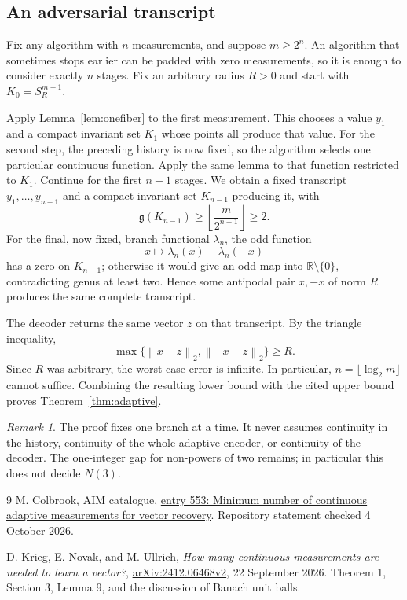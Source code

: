 \documentclass[11pt,a4paper]{article}
\theoremstyle{remark}
\newtheorem{remark}[theorem]{Remark}
\newcommand{\R}{\mathbb R}
\newcommand{\norm}[1]{\left\lVert #1\right\rVert}
\newcommand{\gen}{\mathfrak g}
\begin{document}
\subsection{An adversarial transcript}

Fix any algorithm with $n$ measurements, and suppose $m\ge2^n$. An algorithm that sometimes stops earlier can be padded with zero measurements, so it is enough to consider exactly $n$ stages. Fix an arbitrary radius $R>0$ and start with $K_0=S_R^{m-1}$.

Apply Lemma~\ref{lem:onefiber} to the first measurement. This chooses a value $y_1$ and a compact invariant set $K_1$ whose points all produce that value. For the second step, the preceding history is now fixed, so the algorithm selects one particular continuous function. Apply the same lemma to that function restricted to $K_1$. Continue for the first $n-1$ stages. We obtain a fixed transcript $y_1,\ldots,y_{n-1}$ and a compact invariant set $K_{n-1}$ producing it, with
\[
 \gen(K_{n-1})\ge
 \left\lfloor\frac{m}{2^{n-1}}\right\rfloor\ge2.
\]
For the final, now fixed, branch functional $\lambda_n$, the odd function
\[
 x\longmapsto\lambda_n(x)-\lambda_n(-x)
\]
has a zero on $K_{n-1}$; otherwise it would give an odd map into $\R\setminus\{0\}$, contradicting genus at least two. Hence some antipodal pair $x,-x$ of norm $R$ produces the same complete transcript.

The decoder returns the same vector $z$ on that transcript. By the triangle inequality,
\[
 \max\{\norm{x-z}_2,\norm{-x-z}_2\}\ge R.
\]
Since $R$ was arbitrary, the worst-case error is infinite. In particular, $n=\lfloor\log_2m\rfloor$ cannot suffice. Combining the resulting lower bound with the cited upper bound proves Theorem~\ref{thm:adaptive}.

\begin{remark}
The proof fixes one branch at a time. It never assumes continuity in the history, continuity of the whole adaptive encoder, or continuity of the decoder. The one-integer gap for non-powers of two remains; in particular this does not decide $N(3)$.
\end{remark}



\begin{thebibliography}{9}
M. Colbrook, AIM catalogue, \href{https://github.com/MColbrook/AIM/blob/59a8f0c2957dd272f56bcf282dfe0c066a15f441/problems/553-continuous-adaptive-measurement-complexity.md}{entry 553: Minimum number of continuous adaptive measurements for vector recovery}. Repository statement checked 4 October 2026.

D. Krieg, E. Novak, and M. Ullrich, \emph{How many continuous measurements are needed to learn a vector?}, \href{https://arxiv.org/abs/2412.06468v2}{arXiv:2412.06468v2}, 22 September 2026. Theorem 1, Section 3, Lemma 9, and the discussion of Banach unit balls.
\end{thebibliography}
\end{document}
